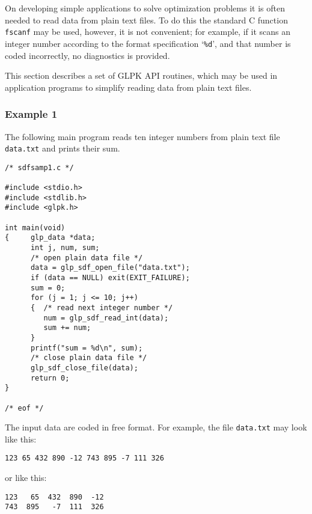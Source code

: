 On developing simple applications to solve optimization problems it is
often needed to read data from plain text files. To do this the standard
C function \verb|fscanf| may be used, however, it is not convenient; for
example, if it scans an integer number according to the format
specification `\verb|%d|', and that number is coded incorrectly,
no diagnostics is provided.

This section describes a set of GLPK API routines, which may be used in
application programs to simplify reading data from plain text files.

\subsubsection*{Example 1}

The following main program reads ten integer numbers from plain text
file \verb|data.txt| and prints their sum.

\begin{footnotesize}
\begin{verbatim}
/* sdfsamp1.c */

#include <stdio.h>
#include <stdlib.h>
#include <glpk.h>

int main(void)
{     glp_data *data;
      int j, num, sum;
      /* open plain data file */
      data = glp_sdf_open_file("data.txt");
      if (data == NULL) exit(EXIT_FAILURE);
      sum = 0;
      for (j = 1; j <= 10; j++)
      {  /* read next integer number */
         num = glp_sdf_read_int(data);
         sum += num;
      }
      printf("sum = %d\n", sum);
      /* close plain data file */
      glp_sdf_close_file(data);
      return 0;
}

/* eof */
\end{verbatim}
\end{footnotesize}

The input data are coded in free format. For example, the file
\verb|data.txt| may look like this:

\begin{footnotesize}
\begin{verbatim}
123 65 432 890 -12 743 895 -7 111 326
\end{verbatim}
\end{footnotesize}

\noindent
or like this:

\begin{footnotesize}
\begin{verbatim}
123   65  432  890  -12
743  895   -7  111  326
\end{verbatim}
\end{footnotesize}

